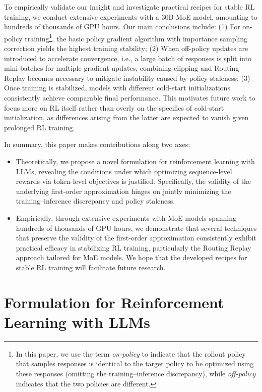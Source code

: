 \documentclass{article}
\begin{document}
To empirically validate our insight and investigate practical recipes for stable RL training, we conduct extensive experiments with a 30B MoE model, amounting to hundreds of thousands of GPU hours.
Our main conclusions include:
(1) For on-policy training\footnote{
In this paper, we use the term \textit{on-policy} to indicate that the rollout policy that samples responses is identical to the target policy to be optimized using these responses (omitting the training–inference discrepancy), while \textit{off-policy} indicates that the two policies are different.
}, the basic policy gradient algorithm with importance sampling correction yields the highest training stability;
(2) When off-policy updates are introduced to accelerate convergence, i.e., a large batch of responses is split into mini-batches for multiple gradient updates, combining clipping and Routing Replay becomes necessary to mitigate instability caused by policy staleness;
(3) Once training is stabilized, models with different cold-start initializations consistently achieve comparable final performance.
This motivates future work to focus more on RL itself rather than overly on the specifics of cold-start initialization, as differences arising from the latter are expected to vanish given prolonged RL training.

In summary, this paper makes contributions along two axes:
\begin{itemize}[leftmargin=10mm, itemsep=2mm]

\item Theoretically, we propose a novel formulation for reinforcement learning with LLMs, revealing the conditions under which optimizing sequence-level rewards via token-level objectives is justified.
Specifically, the validity of the underlying first-order approximation hinges on jointly minimizing the training–inference discrepancy and policy staleness.

\item Empirically, through extensive experiments with MoE models spanning hundreds of thousands of GPU hours, we demonstrate that several techniques that preserve the validity of the first-order approximation consistently exhibit practical efficacy in stabilizing RL training, particularly the Routing Replay approach tailored for MoE models.
We hope that the developed recipes for stable RL training will facilitate future research.

\end{itemize}


\section{Formulation for Reinforcement Learning with LLMs}
\label{sec:formulation}
\end{document}
